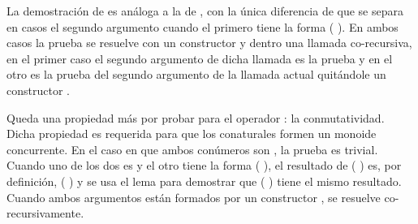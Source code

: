 La demostración de  es análoga a la de , con la única diferencia de que se separa en casos el segundo argumento cuando el primero tiene la forma ( ). En ambos casos la prueba se resuelve con un constructor  y dentro una llamada co-recursiva, en el primer caso el segundo argumento de dicha llamada es la prueba  y en el otro es la prueba del segundo argumento de la llamada actual quitándole un constructor .

Queda una propiedad más por probar para el operador : la conmutatividad. Dicha propiedad es requerida para que los conaturales formen  un monoide concurrente. En el caso en que ambos conúmeros son , la prueba es trivial. Cuando uno de los dos es  y el otro tiene la forma ( ), el resultado de   ( ) es, por definición, ( ) y se usa el lema  para demostrar que  ( )  tiene el mismo resultado. Cuando ambos argumentos están formados por un constructor , se resuelve co-recursivamente.

